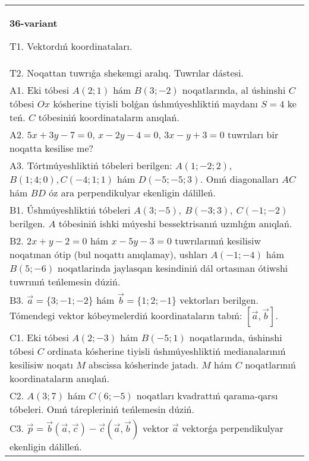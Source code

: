 \documentclass{article}
\begin{document}
\begin{tabular}{m{17cm}}
\textbf{36-variant}
\newline

T1. 
Vektordıń koordinataları.
 \\
T2. 
Noqattan tuwrıǵa shekemgi aralıq. Tuwrılar dástesi.
 \\
A1. 
Eki tóbesi $A(2;1)$ hám $B(3;-2)$ noqatlarında, al
úshinshi $C$ tóbesi $Ox$ kósherine tiyisli bolǵan úshmúyeshliktiń
maydanı $S=4$ ke teń. $C$ tóbesiniń koordinataların anıqlań. \\
A2. 
$5x+3y-7=0$, $x-2y-4=0$, $3x-y+3=0$ 
tuwrıları bir noqatta kesilise me?
 \\
A3. 
Tórtmúyeshliktiń tóbeleri berilgen:
$A (1; - 2;2) $, $B (1;4;0),C (- 4;1;1) $ hám $D (- 5; -5;3) $. Onıń diagonalları $AC$ hám $BD$ óz ara 
perpendikulyar ekenligin dálilleń.
 \\
B1. 
Úshmúyeshliktiń tóbeleri
\(A(3;-5),\ B(-3;3),\ C(-1;-2)\) berilgen. $A$ tóbesiniń ishki
múyeshi bessektrisanıń uzınlıǵın anıqlań.
 \\
B2. 
\(2x+y-2=0\) hám \(x-5y-3=0\)
tuwrılarınıń kesilisiw noqatınan ótip (bul noqattı anıqlamay), ushları
\(A(-1;-4)\) hám \(B(5;-6)\) noqatlarinda jaylasqan kesindiniń
dál ortasınan ótiwshi tuwrınıń teńlemesin dúziń.
 \\
B3. 
$\vec{a} = \{ 3; - 1; - 2\}$ hám $\vec{b} = \{ 1;2; - 1\}$ vektorları berilgen. Tómendegi vektor kóbeymelerdiń koordinataların tabıń: 
$\left\lbrack \vec{a},\vec{b} \right\rbrack$.
 \\
C1. 
Eki tóbesi \(A(2; - 3)\) hám \(B( - 5;1)\) noqatlarında,
úshinshi tóbesi $C$ ordinata kósherine tiyisli úshmúyeshliktiń
medianalarınıń kesilisiw noqatı $M$ abscissa kósherinde jatadı.
$M$ hám $C$ noqatlarınıń koordinataların anıqlań.
 \\
C2. 
\(A(3;7)\) hám \(C(6; - 5)\) noqatları kvadrattıń
qarama-qarsı tóbeleri. Onıń tárepleriniń teńlemesin dúziń.
 \\
C3. 
\(\vec{p} = \vec{b} (\vec{a},\vec{c}) - \vec{c}(\vec{a},\vec{b})\) vektor \(\vec{a}\) vektorǵa perpendikulyar ekenligin dálilleń.
 \\

\end{tabular}
\vspace{1cm}
\end{document}
